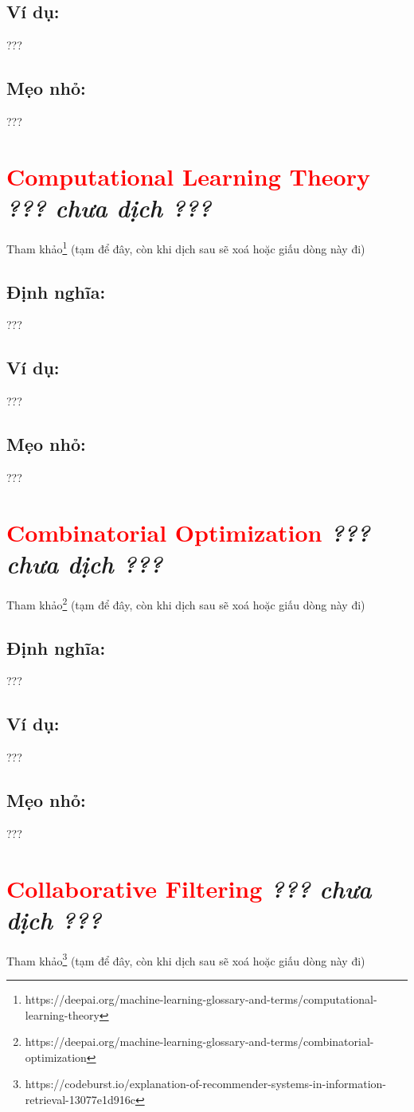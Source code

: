 \subsection*{Ví dụ:}
???
\subsection*{Mẹo nhỏ:}
???
\section*{\huge \textcolor{Red}{Computational Learning Theory}  \small \textit{??? chưa dịch ???} }
Tham khảo\footnote{https://deepai.org/machine-learning-glossary-and-terms/computational-learning-theory} (tạm để đây, còn khi dịch sau sẽ xoá hoặc giấu dòng này đi)
\subsection*{Định nghĩa:}
???
\subsection*{Ví dụ:}
???
\subsection*{Mẹo nhỏ:}
???
\section*{\huge \textcolor{Red}{Combinatorial Optimization}  \small \textit{??? chưa dịch ???} }
Tham khảo\footnote{https://deepai.org/machine-learning-glossary-and-terms/combinatorial-optimization} (tạm để đây, còn khi dịch sau sẽ xoá hoặc giấu dòng này đi)
\subsection*{Định nghĩa:}
???
\subsection*{Ví dụ:}
???
\subsection*{Mẹo nhỏ:}
???
\section*{\huge \textcolor{Red}{Collaborative Filtering}  \small \textit{??? chưa dịch ???} }
Tham khảo\footnote{https://codeburst.io/explanation-of-recommender-systems-in-information-retrieval-13077e1d916c} (tạm để đây, còn khi dịch sau sẽ xoá hoặc giấu dòng này đi)
